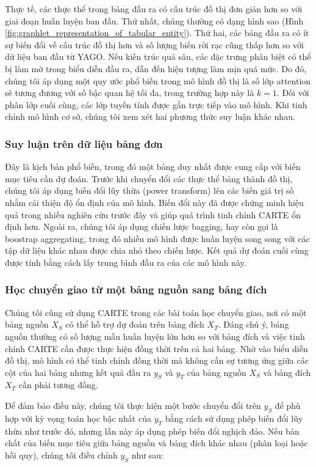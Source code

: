 \documentclass{article}
\begin{document}
Thực tế, các thực thể trong bảng đầu ra có cấu trúc đồ thị đơn giản hơn so với giai đoạn huấn luyện ban đầu. Thứ nhất, chúng thường có dạng hình sao (Hình \ref{fig:graphlet_representation_of_tabular_entity}). Thứ hai, các bảng đầu ra có ít sự biến đổi về cấu trúc đồ thị hơn và số lượng biến rời rạc cũng thấp hơn so với dữ liệu ban đầu từ YAGO. Nếu kiến trúc quá sâu, các đặc trưng phân biệt có thể bị làm mờ trong biểu diễn đầu ra, dẫn đến hiện tượng làm mịn quá mức. Do đó, chúng tôi áp dụng một quy ước phổ biến trong mô hình đồ thị là số lớp attention sẽ tương đương với số bậc quan hệ tối đa, trong trường hợp này là $k=1$. Đối với phân lớp cuối cùng, các lớp tuyến tính được gắn trực tiếp vào mô hình. Khi tinh chỉnh mô hình cơ sở, chúng tôi xem xét hai phương thức suy luận khác nhau.

\subsubsection{Suy luận trên dữ liệu bảng đơn}
Đây là kịch bản phổ biến, trong đó một bảng duy nhất được cung cấp với biến mục tiêu cần dự đoán. Trước khi chuyển đổi các thực thể bảng thành đồ thị, chúng tôi áp dụng biến đổi lũy thừa (power transform) lên các biến giá trị số nhằm cải thiện độ ổn định của mô hình. Biến đổi này đã được chứng minh hiệu quả trong nhiều nghiên cứu trước đây và giúp quá trình tinh chỉnh CARTE ổn định hơn. Ngoài ra, chúng tôi áp dụng chiến lược bagging, hay còn gọi là boostrap aggregating, trong đó nhiều mô hình được huấn luyện song song với các tập dữ liệu khác nhau được chia nhỏ theo chiến lược. Kết quả dự đoán cuối cùng được tính bằng cách lấy trung bình đầu ra của các mô hình này.

\subsubsection{Học chuyển giao từ một bảng nguồn sang bảng đích}
Chúng tôi cũng sử dụng CARTE trong các bài toán học chuyển giao, nơi có một bảng nguồn $X_S$ có thể hỗ trợ dự đoán trên bảng đích $X_T$. Đáng chú ý, bảng nguồn thường có số lượng mẫu huấn luyện lớn hơn so với bảng đích và việc tinh chỉnh CARTE cần được thực hiện đồng thời trên cả hai bảng. Nhờ vào biểu diễn đồ thị, mô hình có thể tinh chỉnh đồng thời mà không cần sự tương ứng giữa các cột của hai bảng nhưng kết quả đầu ra $y_S$ và $y_T$ của bảng nguồn $X_S$ và bảng đích $X_T$ cần phải tương đồng.

Để đảm bảo điều này, chúng tôi thực hiện một bước chuyển đổi trên $y_S$ để phù hợp với kỳ vọng toán học bậc nhất của $y_T$ bằng cách sử dụng phép biến đổi lũy thừa như trước đó, nhưng lần này áp dụng phép biến đổi nghịch đảo. Nếu bản chất của biến mục tiêu giữa bảng nguồn và bảng đích khác nhau (phân loại hoặc hồi quy), chúng tôi điều chỉnh $y_S$ như sau:
\end{document}

